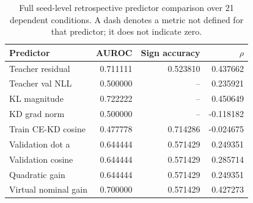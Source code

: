 \begin{table}[!t]\centering
\begin{tabular}{lrrr}
\toprule
Predictor & AUROC & Sign accuracy & $\rho$ \\
\midrule
Teacher residual & 0.711111 & 0.523810 & 0.437662 \\
Teacher val NLL & 0.500000 & -- & 0.235921 \\
KL magnitude & 0.722222 & -- & 0.450649 \\
KD grad norm & 0.500000 & -- & -0.118182 \\
Train CE-KD cosine & 0.477778 & 0.714286 & -0.024675 \\
Validation dot a & 0.644444 & 0.571429 & 0.249351 \\
Validation cosine & 0.644444 & 0.571429 & 0.285714 \\
Quadratic gain & 0.644444 & 0.571429 & 0.249351 \\
Virtual nominal gain & 0.700000 & 0.571429 & 0.427273 \\
\bottomrule
\end{tabular}
\caption{Full seed-level retrospective predictor comparison over 21 dependent conditions. A dash denotes a metric not defined for that predictor; it does not indicate zero.}\label{tab:full_predictors}
\end{table}

